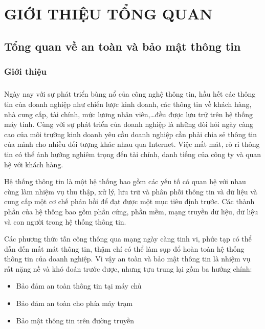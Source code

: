 \chapter{GIỚI THIỆU TỔNG QUAN}

\section{Tổng quan về an toàn và bảo mật thông tin}

\subsection{Giới thiệu}

\paragraph{}

Ngày nay với sự phát triển bùng nổ của công nghệ thông tin, hầu hết các thông tin của doanh nghiệp như chiến lược kinh doanh, các thông tin về khách hàng, nhà cung cấp, tài chính, mức lương nhân viên,…đều được lưu trữ trên hệ thống máy tính. Cùng với sự phát triển của doanh nghiệp là những đòi hỏi ngày càng cao của môi trường kinh doanh yêu cầu doanh nghiệp cần phải chia sẻ thông tin của mình cho nhiều đối tượng khác nhau qua Internet. Việc mất mát, rò rỉ thông tin có thể ảnh hưởng nghiêm trọng đến tài chính, danh tiếng của công ty và quan hệ với khách hàng. 

Hệ thống thông tin là một hệ thống bao gồm các yếu tố có quan hệ với nhau cùng làm nhiệm vụ thu thập, xử lý, lưu trữ và phân phối thông tin và dữ liệu và cung cấp một cơ chế phản hồi để đạt được một mục tiêu định trước. Các thành phần của hệ thống bao gồm phần cứng, phần mềm, mạng truyền dữ liệu, dữ liệu và con người trong hệ thống thông tin.

Các phương thức tấn công thông qua mạng ngày càng tinh vi, phức tạp có thể dẫn đến mất mát thông tin, thậm chí có thể làm sụp đổ hoàn toàn hệ thống thông tin của doanh nghiệp. Vì vậy an toàn và bảo mật thông tin là nhiệm vụ rất nặng nề và khó đoán trước được, nhưng tựu trung lại gồm ba hướng chính: 
\begin{itemize}
    \item Bảo đảm an toàn thông tin tại máy chủ 
    \item Bảo đảm an toàn cho phía máy trạm 
    \item Bảo mật thông tin trên đường truyền 
\end{itemize}

